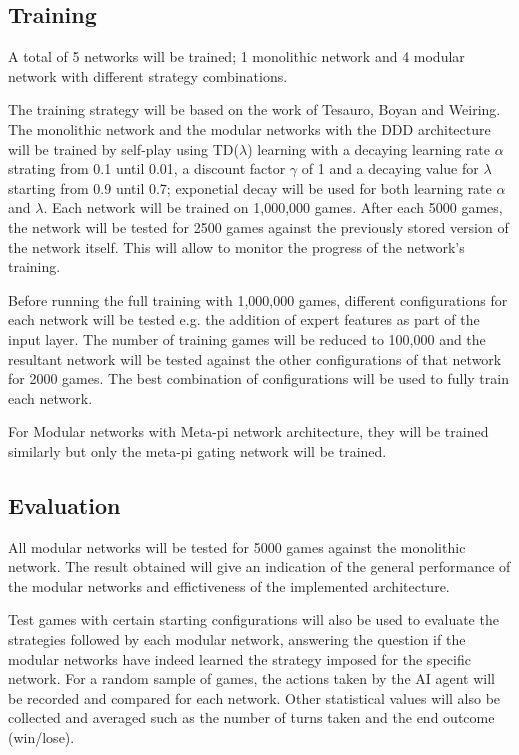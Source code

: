 \documentclass[12pt,a4paper]{article}
\begin{document}
\subsection{Training}
A total of 5 networks will be trained; 1 monolithic network and 4 modular network with different strategy combinations. 

The training strategy will be based on the work of Tesauro, Boyan and Weiring. The monolithic network and the modular networks with the DDD architecture will be trained by self-play using TD($\lambda$) learning with a decaying learning rate $\alpha$ strating from 0.1 until 0.01, a discount factor $\gamma$ of 1 and a decaying value for $\lambda$ starting from 0.9 until 0.7; exponetial decay will be used for both learning rate $\alpha$ and $\lambda$. Each network will be trained on 1,000,000 games. After each 5000 games, the network will be tested for 2500 games against the previously stored version of the network itself. This will allow to monitor the progress of the network's training. 

Before running the full training with 1,000,000 games, different configurations for each network will be tested e.g. the addition of expert features as part of the input layer. The number of training games will be reduced to 100,000 and the resultant network will be tested against the other configurations of that network for 2000 games. The best combination of configurations will be used to fully train each network.

For Modular networks with Meta-pi network architecture, they will be trained similarly but only the meta-pi gating network will be trained.

\subsection{Evaluation}
All modular networks will be tested for 5000 games against the monolithic network. The result obtained will give an indication of the general performance of the modular networks and effictiveness of the implemented architecture. 

Test games with certain starting configurations will also be used to evaluate the strategies followed by each modular network, answering the question if the modular networks have indeed learned the strategy imposed for the specific network. For a random sample of games, the actions taken by the AI agent will be recorded and compared for each network. Other statistical values will also be collected and averaged such as the number of turns taken and the end outcome (win/lose). 
\end{document}
